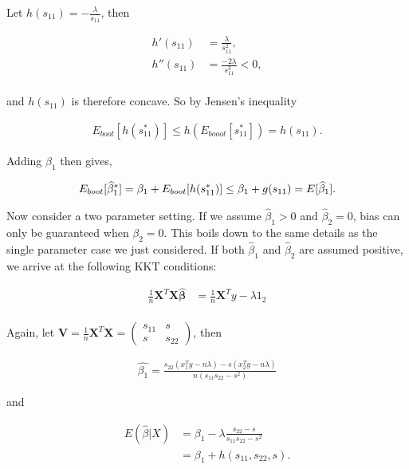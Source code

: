 \noindent Let $h(s_{11}) = - \frac{\lambda}{s_{11}}$, then

$$
\begin{aligned}
h'(s_{11}) &= \frac{\lambda}{s_{11}^2}, \\
h''(s_{11}) &= \frac{-2\lambda}{s_{11}^3}  < 0,\\
\end{aligned}
$$

\noindent and $h(s_{11})$ is therefore concave. So by Jensen's inequality

$$
\begin{aligned}
E_{boot}[h(s_{11}^*)] \leq h(E_{booot}[s_{11}^*]) = h(s_11).
\end{aligned}
$$

\noindent Adding $\beta_1$ then gives,

$$
\begin{aligned}
E_{boot}[\widehat{\beta}_1^*] = \beta_1 + E_{boot}[h(s_{11}^*)] \leq \beta_1 + g(s_{11}) = E[\widehat{\beta}_1].
\end{aligned}
$$

Now consider a two parameter setting. If we assume $\hat{\beta}_1 > 0$ and $\hat{\beta}_2 = 0$, bias can only be guaranteed when $\beta_2 = 0$. This boils down to the same details as the single parameter case we just considered. If both $\hat{\beta}_1$ and $\hat{\beta}_2$ are assumed positive, we arrive at the following KKT conditions:

$$
\begin{aligned}
\frac{1}{n}\boldsymbol{X}^T\boldsymbol{X} \hat{\boldsymbol{\beta}} &= \frac{1}{n}\boldsymbol{X}^Ty - \lambda 1_2 \\
\end{aligned}
$$

\noindent Again, let $\boldsymbol{V} = \frac{1}{n}\boldsymbol{X}^T\boldsymbol{X} = \begin{pmatrix} s_{11} & s \\ s & s_{22} \end{pmatrix}$, then

$$
\begin{aligned}
\hat{\beta_1} = \frac{s_{22}(x_1^Ty- n\lambda) - s(x_2^Ty- n\lambda)}{n(s_{11}s_{22} - s^2)}
\end{aligned}
$$

\noindent and

$$
\begin{aligned}
E(\hat{\beta}|X) &= \beta_1 - \lambda\frac{s_{22} - s}{s_{11}s_{22} - s^2} \\
&= \beta_1 + h(s_{11}, s_{22}, s).
\end{aligned}
$$


